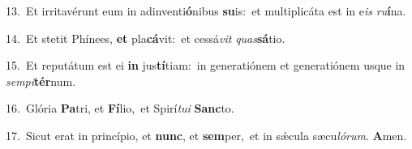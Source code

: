 {\numbfont\textcolor{\numbcolor}{13.}}~Et irritavérunt eum in adinventi\-\textbf{ó}\-nibus \textbf{su}\-is:~\star et multiplicáta est in e\textit{is} \textit{ru}\-\textbf{í}na.\par
{\numbfont\textcolor{\numbcolor}{14.}}~Et stetit Phínees, \textbf{et} pla\-\textbf{cá}\-vit:~\star et cessá\textit{vit} \textit{quas}\-\textbf{sá}tio.\par
{\numbfont\textcolor{\numbcolor}{15.}}~Et reputátum est ei \textbf{in} jus\-\textbf{tí}\-tiam:~\star in generatiónem et generatiónem usque in \textit{sem}\-\textit{pi}\textbf{tér}num.\par
{\numbfont\textcolor{\numbcolor}{16.}}~Glória \textbf{Pa}\-tri, et \textbf{Fí}\-lio,~\star et Spirí\-\textit{tu}\-\textit{i} \textbf{Sanc}\-to.\par
{\numbfont\textcolor{\numbcolor}{17.}}~Sicut erat in princípio, et \textbf{nunc}\-, et \textbf{sem}\-per,~\star et in sǽcula sæcu\-\textit{ló}\-\textit{rum}. \textbf{A}\-men.\par
